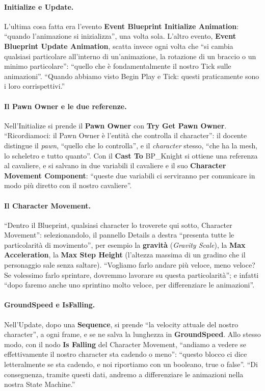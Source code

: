 \paragraph{Initialize e Update.} L'ultima cosa fatta era l'evento \textbf{Event Blueprint
Initialize Animation}: ``quando l'animazione si inizializza'', una volta sola. L'altro
evento, \textbf{Event Blueprint Update Animation}, scatta invece ogni volta che
``si cambia qualsiasi particolare all'interno di un'animazione, la rotazione di un braccio
o un minimo particolare'': ``quello che è fondamentalmente il nostro Tick sulle
animazioni''. ``Quando abbiamo visto Begin Play e Tick: questi praticamente sono i loro
corrispettivi.''

\paragraph{Il Pawn Owner e le due referenze.} Nell'Initialize si prende il \textbf{Pawn
Owner} con \textbf{Try Get Pawn Owner}. ``Ricordiamoci: il Pawn Owner è l'entità che
controlla il character'': il docente distingue il \emph{pawn}, ``quello che lo controlla'',
e il \emph{character} stesso, ``che ha la mesh, lo scheletro e tutto quanto''. Con il
\textbf{Cast To} BP\_Knight si ottiene una referenza al cavaliere, e si salvano in due
variabili il cavaliere e il suo \textbf{Character Movement Component}: ``queste due
variabili ci serviranno per comunicare in modo più diretto con il nostro cavaliere''.

\paragraph{Il Character Movement.} ``Dentro il Blueprint, qualsiasi character lo troverete
qui sotto, Character Movement'': selezionandolo, il pannello Details a destra ``presenta
tutte le particolarità di movimento'', per esempio la \textbf{gravità} (\emph{Gravity
Scale}), la \textbf{Max Acceleration}, la \textbf{Max Step Height} (l'altezza massima di
un gradino che il personaggio sale senza saltare). ``Vogliamo farlo andare più veloce,
meno veloce? Se volessimo farlo sprintare, dovremmo lavorare su questa particolarità''; e
infatti ``dopo faremo anche uno sprintino molto veloce, per differenziare le
animazioni''.

\paragraph{GroundSpeed e IsFalling.} Nell'Update, dopo una \textbf{Sequence}, si prende
``la velocity attuale del nostro character'', a ogni frame, e se ne salva la lunghezza in
\textbf{GroundSpeed}. Allo stesso modo, con il nodo \textbf{Is Falling} del Character
Movement, ``andiamo a vedere se effettivamente il nostro character sta cadendo o meno'':
``questo blocco ci dice letteralmente se sta cadendo, e noi riportiamo con un booleano,
true o false''. ``Di conseguenza, tramite questi dati, andremo a differenziare le
animazioni nella nostra State Machine.''

